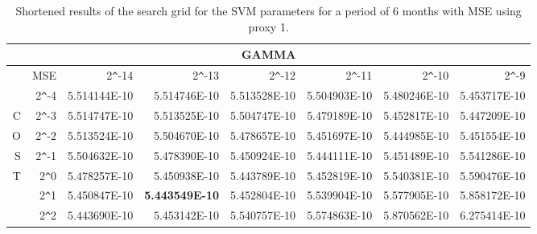 \begin{table}[h!]
\centering
\begin{adjustbox}{width=\textwidth}
\begin{tabular}{|r|r|rrrrrr|}
\hline
\multicolumn{8}{|c|}{GAMMA} \tabularnewline
\hline
  &MSE&  2\verb|^|-14 & 2\verb|^|-13 & 2\verb|^|-12 & 2\verb|^|-11 & 2\verb|^|-10 & 2\verb|^|-9 \\ 
  \hline
  &2\verb|^|-4 & 5.514144E-10 & 5.514746E-10 & 5.513528E-10 & 5.504903E-10 & 5.480246E-10 & 5.453717E-10 \\ 
  C&2\verb|^|-3 & 5.514747E-10 & 5.513525E-10 & 5.504747E-10 & 5.479189E-10 & 5.452817E-10 & 5.447209E-10 \\ 
  O&2\verb|^|-2 & 5.513524E-10 & 5.504670E-10 & 5.478657E-10 & 5.451697E-10 & 5.444985E-10 & 5.451554E-10 \\ 
  S&2\verb|^|-1 & 5.504632E-10 & 5.478390E-10 & 5.450924E-10 & 5.444111E-10 & 5.451489E-10 & 5.541286E-10 \\ 
  T&2\verb|^|0 & 5.478257E-10 & 5.450938E-10 & 5.443789E-10 & 5.452819E-10 & 5.540381E-10 & 5.590476E-10 \\ 
  &2\verb|^|1 & 5.450847E-10 & \textbf{5.443549E-10} & 5.452804E-10 & 5.539904E-10 & 5.577905E-10 & 5.858172E-10 \\ 
  &2\verb|^|2 & 5.443690E-10 & 5.453142E-10 & 5.540757E-10 & 5.574863E-10 & 5.870562E-10 & 6.275414E-10 \\ 
   \hline
\end{tabular}
\end{adjustbox}
\caption{Shortened results of the search grid for the SVM parameters for a period of 6 months with MSE using proxy 1.}
\end{table}